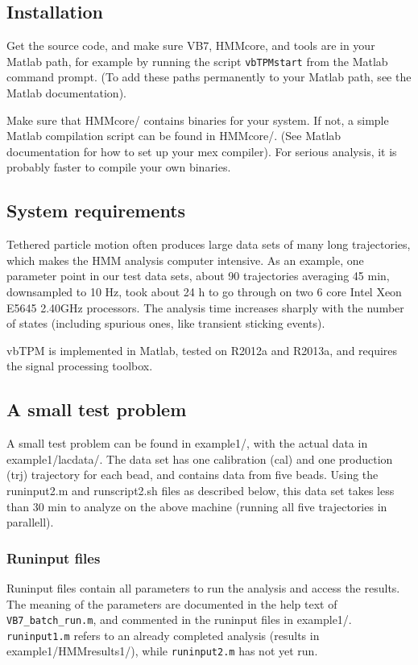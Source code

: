 \subsection{Installation}
Get the source code, and make sure VB7, HMMcore, and tools are in your
Matlab path, for example by running the script \verb+vbTPMstart+ from
the Matlab command prompt. (To add these paths permanently to your
Matlab path, see the Matlab documentation).

Make sure that HMMcore/ contains binaries for your system. If not, a
simple Matlab compilation script can be found in HMMcore/. (See Matlab
documentation for how to set up your mex compiler). For serious
analysis, it is probably faster to compile your own binaries.

\subsection{System requirements}
Tethered particle motion often produces large data sets of many long
trajectories, which makes the HMM analysis computer intensive. As an
example, one parameter point in our test data sets, about 90
trajectories averaging 45 min, downsampled to 10 Hz, took about 24 h
to go through on two 6 core Intel Xeon E5645 2.40GHz processors. The
analysis time increases sharply with the number of states (including
spurious ones, like transient sticking events).

vbTPM is implemented in Matlab, tested on R2012a and R2013a, and
requires the signal processing toolbox.

\subsection{A small test problem}
A small test problem can be found in example1/, with the actual data
in example1/lacdata/.  The data set has one calibration (cal) and one
production (trj) trajectory for each bead, and contains data from five
beads. Using the runinput2.m and runscript2.sh files as described
below, this data set takes less than 30 min to analyze on the above
machine (running all five trajectories in parallell).

\subsubsection*{Runinput files} 
Runinput files contain all parameters to run the analysis and access
the results. The meaning of the parameters are documented in the help
text of \verb+VB7_batch_run.m+, and commented in the runinput files in
example1/.  \verb+runinput1.m+ refers to an already completed analysis
(results in example1/HMMresults1/), while \verb+runinput2.m+ has not
yet run.

